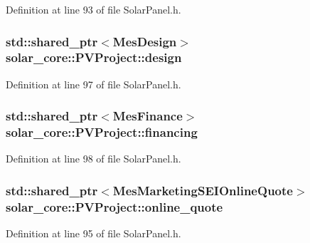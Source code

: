 Definition at line 93 of file Solar\+Panel.\+h.

\hypertarget{classsolar__core_1_1_p_v_project_a0e3e8228c8129ccd07e44503ef8577a8}{}
\subsubsection[{design}]{\setlength{\rightskip}{0pt plus 5cm}std\+::shared\+\_\+ptr$<${\bf Mes\+Design}$>$ solar\+\_\+core\+::\+P\+V\+Project\+::design}\label{classsolar__core_1_1_p_v_project_a0e3e8228c8129ccd07e44503ef8577a8}


Definition at line 97 of file Solar\+Panel.\+h.

\hypertarget{classsolar__core_1_1_p_v_project_adf809769d8d38859f2f766fb5332b946}{}
\subsubsection[{financing}]{\setlength{\rightskip}{0pt plus 5cm}std\+::shared\+\_\+ptr$<${\bf Mes\+Finance}$>$ solar\+\_\+core\+::\+P\+V\+Project\+::financing}\label{classsolar__core_1_1_p_v_project_adf809769d8d38859f2f766fb5332b946}


Definition at line 98 of file Solar\+Panel.\+h.

\hypertarget{classsolar__core_1_1_p_v_project_ae7998ae898c0230fbde18818cfd088a1}{}
\subsubsection[{online\+\_\+quote}]{\setlength{\rightskip}{0pt plus 5cm}std\+::shared\+\_\+ptr$<${\bf Mes\+Marketing\+S\+E\+I\+Online\+Quote}$>$ solar\+\_\+core\+::\+P\+V\+Project\+::online\+\_\+quote}\label{classsolar__core_1_1_p_v_project_ae7998ae898c0230fbde18818cfd088a1}


Definition at line 95 of file Solar\+Panel.\+h.

\hypertarget{classsolar__core_1_1_p_v_project_a5d75e9dfe664f7307b0dc24c1f00d8a9}{}
